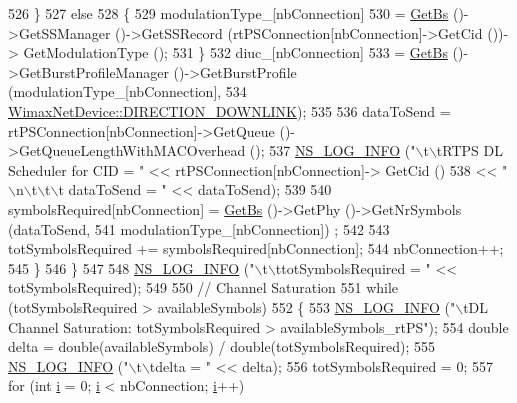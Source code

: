 \begin{DoxyCode}
526             \}
527           \textcolor{keywordflow}{else}
528             \{
529               modulationType\_[nbConnection]
530                 = \hyperlink{classns3_1_1BSScheduler_a8b09065ac8f74cb35446af55128e41c7}{GetBs} ()->GetSSManager ()->GetSSRecord (rtPSConnection[nbConnection]->GetCid ())->
      GetModulationType ();
531             \}
532           diuc\_[nbConnection]
533             = \hyperlink{classns3_1_1BSScheduler_a8b09065ac8f74cb35446af55128e41c7}{GetBs} ()->GetBurstProfileManager ()->GetBurstProfile (modulationType\_[nbConnection],
534                                                                     
      \hyperlink{classns3_1_1WimaxNetDevice_a194b6cf7eb59582328eb2531dc9ed884a5873dae7c36e21d904ae2d6922835e89}{WimaxNetDevice::DIRECTION\_DOWNLINK});
535 
536           dataToSend = rtPSConnection[nbConnection]->GetQueue ()->GetQueueLengthWithMACOverhead ();
537           \hyperlink{group__logging_gafbd73ee2cf9f26b319f49086d8e860fb}{NS\_LOG\_INFO} (\textcolor{stringliteral}{"\(\backslash\)t\(\backslash\)tRTPS DL Scheduler for CID = "} << rtPSConnection[nbConnection]->
      GetCid ()
538                                                           << \textcolor{stringliteral}{"\(\backslash\)n\(\backslash\)t\(\backslash\)t\(\backslash\)t dataToSend = "} << dataToSend);
539 
540           symbolsRequired[nbConnection] = \hyperlink{classns3_1_1BSScheduler_a8b09065ac8f74cb35446af55128e41c7}{GetBs} ()->GetPhy ()->GetNrSymbols (dataToSend,
541                                                                              modulationType\_[nbConnection])
      ;
542 
543           totSymbolsRequired += symbolsRequired[nbConnection];
544           nbConnection++;
545         \}
546     \}
547 
548   \hyperlink{group__logging_gafbd73ee2cf9f26b319f49086d8e860fb}{NS\_LOG\_INFO} (\textcolor{stringliteral}{"\(\backslash\)t\(\backslash\)ttotSymbolsRequired = "} << totSymbolsRequired);
549 
550   \textcolor{comment}{// Channel Saturation}
551   \textcolor{keywordflow}{while} (totSymbolsRequired > availableSymbols)
552     \{
553       \hyperlink{group__logging_gafbd73ee2cf9f26b319f49086d8e860fb}{NS\_LOG\_INFO} (\textcolor{stringliteral}{"\(\backslash\)tDL Channel Saturation: totSymbolsRequired > availableSymbols\_rtPS"});
554       \textcolor{keywordtype}{double} delta = double(availableSymbols) / double(totSymbolsRequired);
555       \hyperlink{group__logging_gafbd73ee2cf9f26b319f49086d8e860fb}{NS\_LOG\_INFO} (\textcolor{stringliteral}{"\(\backslash\)t\(\backslash\)tdelta = "} << delta);
556       totSymbolsRequired = 0;
557       \textcolor{keywordflow}{for} (\textcolor{keywordtype}{int} \hyperlink{bernuolliDistribution_8m_a6f6ccfcf58b31cb6412107d9d5281426}{i} = 0; \hyperlink{bernuolliDistribution_8m_a6f6ccfcf58b31cb6412107d9d5281426}{i} < nbConnection; \hyperlink{bernuolliDistribution_8m_a6f6ccfcf58b31cb6412107d9d5281426}{i}++)

\end{DoxyCode}
